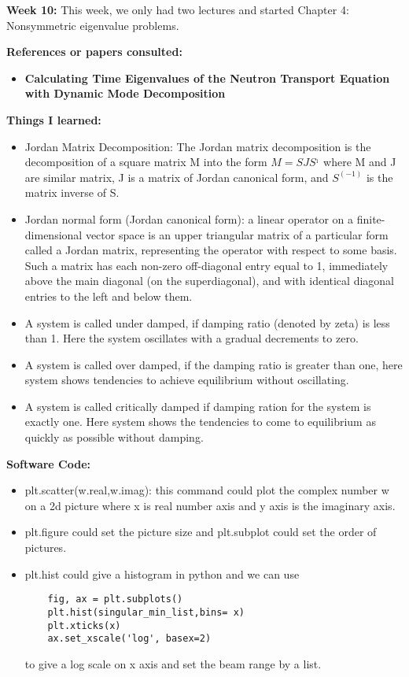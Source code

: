 \documentclass{article}
\begin{document}
\newpage
\textbf{Week 10:}
This week, we only had two lectures and started Chapter 4: Nonsymmetric eigenvalue problems.

\textbf{References or papers consulted:}
\begin{itemize}

\item \textbf{Calculating Time Eigenvalues of the Neutron Transport Equation with Dynamic Mode Decomposition}

\end{itemize}

\textbf{Things I learned:}
\begin{itemize}
\item Jordan Matrix Decomposition: The Jordan matrix decomposition is the decomposition of a square matrix M into the form $ M =SJS^{_1}$ where M and J are similar matrix, J is a matrix of Jordan canonical form, and $S^(-1)$ is the matrix inverse of S.
\item Jordan normal form (Jordan canonical form): a linear operator on a finite-dimensional vector space is an upper triangular matrix of a particular form called a Jordan matrix, representing the operator with respect to some basis. Such a matrix has each non-zero off-diagonal entry equal to 1, immediately above the main diagonal (on the superdiagonal), and with identical diagonal entries to the left and below them.
\item A system is called under damped, if damping ratio (denoted by zeta) is less than 1. Here the system oscillates with a gradual decrements to zero.
\item A system is called over damped, if the damping ratio is greater than one, here system shows tendencies to achieve equilibrium without oscillating. 
\item A system is called critically damped if damping ration for the system is exactly one. Here system shows the tendencies to come to equilibrium as quickly as possible without damping.
\end{itemize}

\textbf{Software Code:}
\begin{itemize}
\item plt.scatter(w.real,w.imag): this command could plot the complex number w on a 2d picture where x is real number axis and y axis is the imaginary axis.
\item plt.figure could set the picture size and plt.subplot could set the order of pictures.
\item plt.hist could give a histogram in python and we can use
\begin{verbatim}
    fig, ax = plt.subplots()
    plt.hist(singular_min_list,bins= x)
    plt.xticks(x)
    ax.set_xscale('log', basex=2)
\end{verbatim}
to give a log scale on x axis and set the beam range by a list.
\end{itemize}
\end{document}
